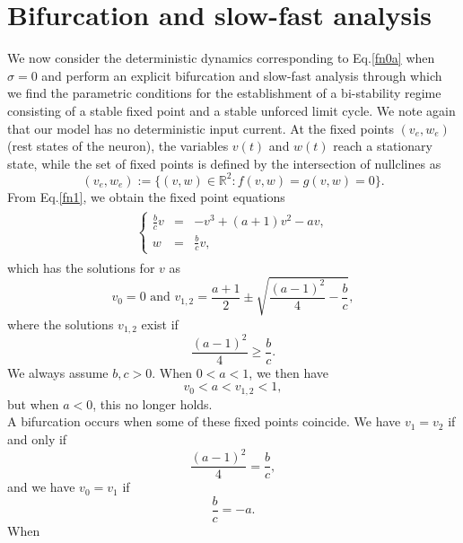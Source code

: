 \section{Bifurcation and slow-fast analysis}\label{sect3}
\noindent
We now consider the deterministic dynamics corresponding to  Eq.\eqref{fn0a} when $\sigma = 0$ and perform an explicit
bifurcation and slow-fast analysis through which we find the parametric conditions for the
establishment of a bi-stability regime consisting of a stable fixed
point and a stable unforced limit cycle. We note again that our model has no
deterministic input current. At the fixed points $(v_e,w_e)$
(rest states of the neuron), the variables $v(t)$ and $w(t)$ reach
a stationary state, while the set of fixed points is defined
by the intersection of nullclines as
\begin{equation}\label{fn1}
(v_e,w_e):=\Big\{(v,w)\in\mathbb{R}^2:f(v,w)=g(v,w)=0\Big\}.
\end{equation}
From Eq.\eqref{fn1}, we obtain the fixed point equations
\begin{align}\label{fn20}
\begin{split}
\left\{\begin{array}{lcl}
 \frac{b}{c}v&=&-v^3+(a+1)v^2-av,\\
  w&=&\frac{b}{c}v,
 \end{array}\right.
\end{split}
\end{align}
which has the solutions for $v$ as
\begin{equation}\label{fn21}
v_0=0 \text{ and } v_{1,2}=\frac{a+1}{2}\pm \sqrt{\frac{(a-1)^2}{4} -\frac{b}{c}},
\end{equation}
where the solutions $v_{1,2}$ exist if
\begin{equation}\label{fn22}
\frac{(a-1)^2}{4}\ge \frac{b}{c}.
\end{equation}
We always assume $b,c >0$.
When $0<a<1$, we then have
\begin{equation}\label{fn22a}
v_0 <a< v_{1,2} <1,
\end{equation}
but when $a<0$, this no longer holds.\\
A bifurcation occurs when some of these fixed points coincide. We
have $v_1=v_2$ if and only if \begin{equation}\label{fn22b} \frac{(a-1)^2}{4} =\frac{b}{c},\end{equation}
and we have $v_0=v_1$ if \begin{equation}\label{fn22c} \frac{b}{c}=-a. \end{equation} When
